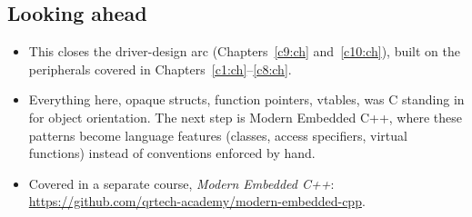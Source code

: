 \subsection*{Looking ahead}
\begin{itemize}
  \item This closes the driver-design arc (Chapters~\ref{c9:ch} and~\ref{c10:ch}), built on the
    peripherals covered in Chapters~\ref{c1:ch}--\ref{c8:ch}.
  \item Everything here, opaque structs, function pointers, vtables, was C standing in for object
    orientation. The next step is Modern Embedded C++, where these patterns become language
    features (classes, access specifiers, virtual functions) instead of conventions enforced by
    hand.
  \item Covered in a separate course, \emph{Modern Embedded C++}:
    \url{https://github.com/qrtech-academy/modern-embedded-cpp}.
\end{itemize}
